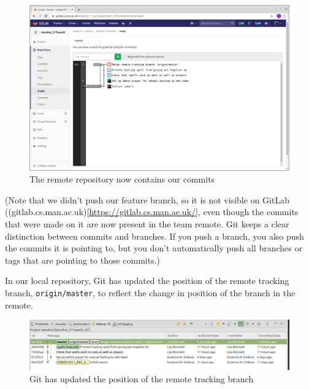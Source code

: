 \documentclass[
]{book}
\begin{document}
\begin{figure}

{\centering \includegraphics[width=1\linewidth]{images/commitGraphInGitLabAfterNonFFMergePushedNoHistory} 

}

\caption{The remote repository now contains our commits}\label{fig:commitGraphInGitLabAfterNonFFMergePushedNoHistory-fig}
\end{figure}

(Note that we didn't push our feature branch, so it is not visible on GitLab ((gitlab.cs.man.ac.uk){[}\url{https://gitlab.cs.man.ac.uk/}{]}, even though the commits that were made on it are now present in the team remote. Git keeps a clear distinction between commits and branches. If you push a branch, you also push the commits it is pointing to, but you don't automatically push all branches or tags that are pointing to those commits.)

In our local repository, Git has updated the position of the remote tracking branch, \texttt{origin/master}, to reflect the change in position of the branch in the remote.

\begin{figure}

{\centering \includegraphics[width=1\linewidth]{images/localCommitGraphAfterSuccessfulPushAfterNonFFMergeNoHistory} 

}

\caption{Git has updated the position of the remote tracking branch}\label{fig:localCommitGraphAfterSuccessfulPushAfterNonFFMergeNoHistory-fig}
\end{figure}
\end{document}
